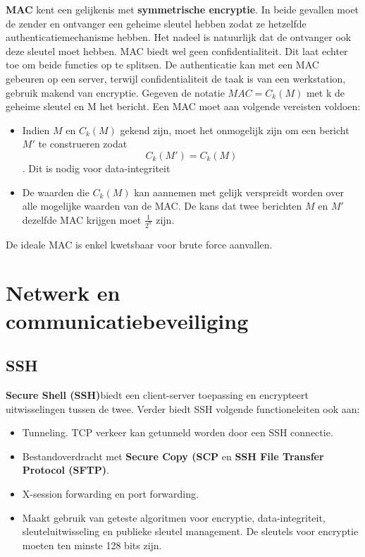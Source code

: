 \documentclass{report}
\begin{document}
	\textbf{MAC} kent een gelijkenis met \textbf{symmetrische encryptie}. In beide gevallen moet de zender en ontvanger een geheime sleutel hebben zodat ze hetzelfde authenticatiemechanisme hebben. Het nadeel is natuurlijk dat de ontvanger ook deze sleutel moet hebben. MAC biedt wel geen confidentialiteit. Dit laat echter toe om beide functies op te splitsen. De authenticatie kan met een MAC gebeuren op een server, terwijl confidentialiteit de taak is van een werkstation, gebruik makend van encryptie. Gegeven de notatie \textbf{$MAC = C_k(M)$} met k de geheime sleutel en M het bericht. Een MAC moet aan volgende vereisten voldoen:
	\begin{itemize}
		\item Indien $M$ en $C_k(M)$ gekend zijn, moet het onmogelijk zijn om een bericht $M'$ te construeren zodat \textbf{$$C_k(M') = C_k(M)$$}. Dit is nodig voor data-integriteit
		
		\item De waarden die $C_k(M)$ kan aannemen met gelijk verspreidt worden over alle mogelijke waarden van de MAC. De kans dat twee berichten $M$ en $M'$ dezelfde MAC krijgen moet $\frac{1}{2^n}$ zijn.
	\end{itemize}

	De ideale MAC is enkel kwetsbaar voor brute force aanvallen. 

	\chapter{Netwerk en communicatiebeveiliging}
	\section{SSH}
	\textbf{Secure Shell (SSH)}biedt een client-server toepassing en encrypteert uitwisselingen tussen de twee. Verder biedt SSH volgende functioneleiten ook aan:
	\begin{itemize}
		\item Tunneling. TCP verkeer kan getunneld worden door een SSH connectie.
		\item Bestandoverdracht met \textbf{Secure Copy (SCP} en \textbf{SSH File Transfer Protocol (SFTP)}.
		\item X-session forwarding en port forwarding.
		\item Maakt gebruik van geteste algoritmen voor encryptie, data-integriteit, sleuteluitwisseling en publieke sleutel management. De sleutels voor encryptie moeten ten minste 128 bits zijn.
	\end{itemize}
\end{document}

